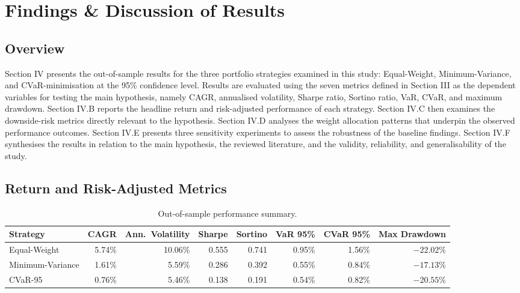 \section{Findings \& Discussion of Results}
\label{sec:Fin}

\subsection{Overview}
\par Section IV presents the out-of-sample results for the three portfolio strategies examined in this study: Equal-Weight, Minimum-Variance, and CVaR-minimisation at the 95\% confidence level. Results are evaluated using the seven metrics defined in Section III as the dependent variables for testing the main hypothesis, namely CAGR, annualised volatility, Sharpe ratio, Sortino ratio, VaR, CVaR, and maximum drawdown. Section IV.B reports the headline return and risk-adjusted performance of each strategy. Section IV.C then examines the downside-risk metrics directly relevant to the hypothesis. Section IV.D analyses the weight allocation patterns that underpin the observed performance outcomes. Section IV.E presents three sensitivity experiments to assess the robustness of the baseline findings. Section IV.F synthesises the results in relation to the main hypothesis, the reviewed literature, and the validity, reliability, and generalisability of the study.

\subsection{Return and Risk-Adjusted Metrics}

\begin{table}[!t]
    \centering
    \caption{Out-of-sample performance summary.}
    \label{tab:performance-summary}
    \footnotesize
    \setlength{\tabcolsep}{5pt}
    \renewcommand{\arraystretch}{1.15}
    \begin{tabular}{l|r|r|r|r|r|r|r}
    \textbf{Strategy} & \textbf{CAGR} & \textbf{Ann.\ Volatility} & \textbf{Sharpe} & \textbf{Sortino} & \textbf{VaR 95\%} & \textbf{CVaR 95\%} & \textbf{Max Drawdown} \\ \hline
    Equal-Weight     & 5.74\% & 10.06\% & 0.555 & 0.741 & 0.95\% & 1.56\% & $-22.02\%$ \\
    Minimum-Variance & 1.61\% &  5.59\% & 0.286 & 0.392 & 0.55\% & 0.84\% & $-17.13\%$ \\
    CVaR-95          & 0.76\% &  5.46\% & 0.138 & 0.191 & 0.54\% & 0.82\% & $-20.55\%$ \\
    \end{tabular}
\end{table}

